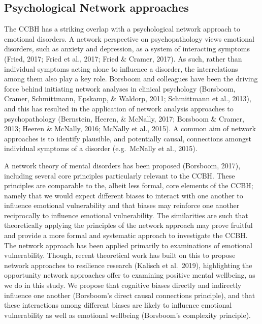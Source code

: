 \documentclass[
  english,
  man,floatsintext]{apa6}
\begin{document}
\hypertarget{psychological-network-approaches}{%
\subsection{Psychological Network approaches}\label{psychological-network-approaches}}

The CCBH has a striking overlap with a psychological network approach to emotional disorders. A network perspective on psychopathology views emotional disorders, such as anxiety and depression, as a system of interacting symptoms (Fried, 2017; Fried et al., 2017; Fried \& Cramer, 2017). As such, rather than individual symptoms acting alone to influence a disorder, the interrelations among them also play a key role. Borsboom and colleagues have been the driving force behind initiating network analyses in clinical psychology (Borsboom, Cramer, Schmittmann, Epskamp, \& Waldorp, 2011; Schmittmann et al., 2013), and this has resulted in the application of network analysis approaches to psychopathology (Bernstein, Heeren, \& McNally, 2017; Borsboom \& Cramer, 2013; Heeren \& McNally, 2016; McNally et al., 2015). A common aim of network approaches is to identify plausible, and potentially causal, connections amongst individual symptoms of a disorder (e.g.~McNally et al., 2015).

A network theory of mental disorders has been proposed (Borsboom, 2017), including several core principles particularly relevant to the CCBH. These principles are comparable to the, albeit less formal, core elements of the CCBH; namely that we would expect different biases to interact with one another to influence emotional vulnerability and that biases may reinforce one another reciprocally to influence emotional vulnerability. The similarities are such that theoretically applying the principles of the network approach may prove fruitful and provide a more formal and systematic approach to investigate the CCBH. The network approach has been applied primarily to examinations of emotional vulnerability. Though, recent theoretical work has built on this to propose network approaches to resilience research (Kalisch et al.~2019), highlighting the opportunity network approaches offer to examining positive mental wellbeing, as we do in this study. We propose that cognitive biases directly and indirectly influence one another (Borsboom's direct causal connections principle), and that these interactions among different biases are likely to influence emotional vulnerability as well as emotional wellbeing (Borsboom's complexity principle).
\end{document}
